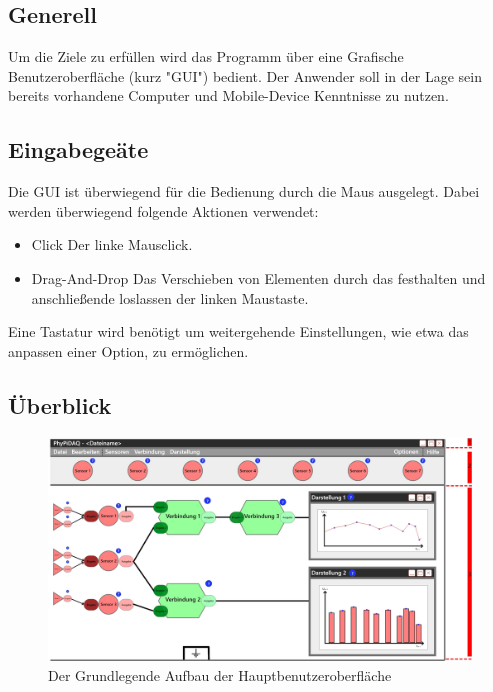 \documentclass[parskip=full]{scrartcl}
\begin{document}
\subsection{Generell}

Um die Ziele zu erfüllen wird das Programm über eine Grafische Benutzeroberfläche (kurz "GUI") bedient. Der Anwender soll in der Lage sein bereits vorhandene Computer und Mobile-Device Kenntnisse zu nutzen.

\subsection{Eingabegeäte}

Die GUI ist überwiegend für die Bedienung durch die Maus ausgelegt. Dabei werden überwiegend folgende Aktionen verwendet:

\begin{itemize} 
	\item Click \newline Der linke Mausclick.
	\item Drag-And-Drop \newline Das Verschieben von Elementen durch das festhalten und anschließende loslassen der linken Maustaste.
\end{itemize}

Eine Tastatur wird benötigt um weitergehende Einstellungen, wie etwa das anpassen einer Option, zu ermöglichen.



\subsection{Überblick}

\begin{figure}[h]
	\begin{center}
		\includegraphics[width = 12cm]{Grafik/GUI-mit-Segmenten.jpg}
		\caption{Der Grundlegende Aufbau der Hauptbenutzeroberfläche}
		\label{GUI_Grundlage}
	\end{center}
\end{figure}
\end{document}
